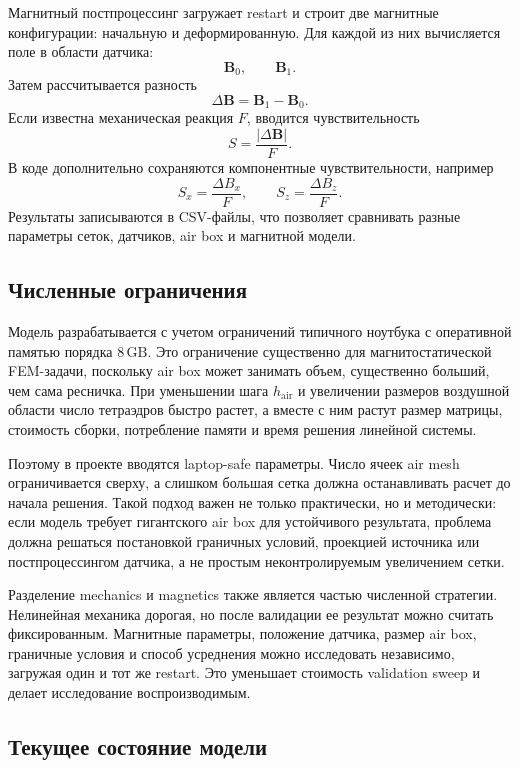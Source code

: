 \documentclass[12pt,a4paper]{article}
\begin{document}
Магнитный постпроцессинг загружает restart и строит две магнитные конфигурации:
начальную и деформированную. Для каждой из них вычисляется поле в области
датчика:
\[
    \mathbf B_0,\qquad \mathbf B_1.
\]
Затем рассчитывается разность
\[
    \Delta\mathbf B =
    \mathbf B_1-\mathbf B_0.
\]
Если известна механическая реакция \(F\), вводится чувствительность
\[
    S =
    \frac{|\Delta\mathbf B|}{F}.
\]
В коде дополнительно сохраняются компонентные чувствительности, например
\[
    S_x = \frac{\Delta B_x}{F},\qquad
    S_z = \frac{\Delta B_z}{F}.
\]
Результаты записываются в CSV-файлы, что позволяет сравнивать разные параметры
сеток, датчиков, air box и магнитной модели.

\subsection{Численные ограничения}

Модель разрабатывается с учетом ограничений типичного ноутбука с оперативной
памятью порядка \(8\,\mathrm{GB}\). Это ограничение существенно для
магнитостатической FEM-задачи, поскольку air box может занимать объем,
существенно больший, чем сама ресничка. При уменьшении шага \(h_{\mathrm{air}}\)
и увеличении размеров воздушной области число тетраэдров быстро растет, а
вместе с ним растут размер матрицы, стоимость сборки, потребление памяти и
время решения линейной системы.

Поэтому в проекте вводятся laptop-safe параметры. Число ячеек air mesh
ограничивается сверху, а слишком большая сетка должна останавливать расчет до
начала решения. Такой подход важен не только практически, но и методически:
если модель требует гигантского air box для устойчивого результата, проблема
должна решаться постановкой граничных условий, проекцией источника или
постпроцессингом датчика, а не простым неконтролируемым увеличением сетки.

Разделение mechanics и magnetics также является частью численной стратегии.
Нелинейная механика дорогая, но после валидации ее результат можно считать
фиксированным. Магнитные параметры, положение датчика, размер air box,
граничные условия и способ усреднения можно исследовать независимо, загружая
один и тот же restart. Это уменьшает стоимость validation sweep и делает
исследование воспроизводимым.

\subsection{Текущее состояние модели}
\end{document}
